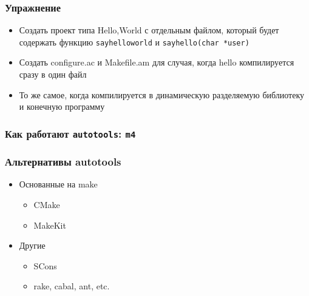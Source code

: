 \begin{frame}
 \frametitle{Упражнение}
 \begin{itemize}
  \item Создать проект типа Hello,World с отдельным файлом, который будет содержать функцию \texttt{sayhelloworld} и \texttt{sayhello(char *user)} 
  \item Создать configure.ac и Makefile.am для случая, когда hello компилируется сразу в один файл
  \item То же самое, когда компилируется в динамическую разделяемую библиотеку и конечную программу
 \end{itemize}
\end{frame}

\begin{frame}
 \frametitle{Как работают \texttt{autotools}: \texttt{m4}}
\end{frame}

\begin{frame}
 \frametitle{Альтернативы autotools}
\begin{itemize}
  \item{Основанные на make}
  \begin{itemize}
    \item CMake
    \item MakeKit
  \end{itemize}
  \item{Другие}
    \begin{itemize}
      \item SCons
      \item rake, cabal, ant, etc.
    \end{itemize}
\end{itemize}
\end{frame}
